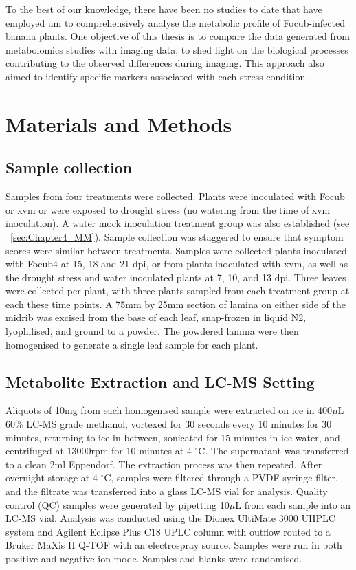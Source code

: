To the best of our knowledge, there have been no studies to date that have employed \ac{um} to comprehensively analyse the metabolic profile of \ac{Focub}-infected banana plants. One objective of this thesis is to compare the data generated from metabolomics studies with imaging data, to shed light on the biological processes contributing to the observed differences during imaging. This approach also aimed to identify specific markers associated with each stress condition. 

\newpage
\section{Materials and Methods}

\subsection{Sample collection}
Samples from four treatments were collected. Plants were inoculated with \ac{Focub} or \ac{xvm} or were exposed to drought stress (no watering from the time of \ac{xvm} inoculation). A water mock inoculation treatment group was also established (see ~\ref{sec:Chapter4_MM}). 
Sample collection was staggered to ensure that symptom scores were similar between treatments. Samples were collected plants inoculated with \ac{Focub4} at 15, 18 and 21 \ac{dpi}, or from plants inoculated with \ac{xvm}, as well as the drought stress and water inoculated plants at 7, 10, and 13 \ac{dpi}. Three leaves were collected per plant, with three plants sampled from each treatment group at each these time points. A 75mm by 25mm section of lamina on either side of the midrib was excised from the base of each leaf, snap-frozen in liquid N2, lyophilised, and ground to a powder. The powdered lamina were then homogenised to generate a single leaf sample for each plant. 

\subsection{Metabolite Extraction and LC-MS Setting}
Aliquots of 10mg from each homogenised sample were extracted on ice in 400\(\mu\)L 60\% LC-MS grade methanol, vortexed for 30 seconds every 10 minutes for 30 minutes, returning to ice in between, sonicated for 15 minutes in ice-water, and centrifuged at 13000rpm for 10 minutes at 4 $^{\circ}$C. The supernatant was transferred to a clean 2ml Eppendorf. The extraction process was then repeated. After overnight storage at 4 $^{\circ}$C, samples were filtered through a PVDF syringe filter, and the filtrate was transferred into a glass LC-MS vial for analysis. Quality control (QC) samples were generated by pipetting 10\(\mu\)L from each sample into an LC-MS vial. Analysis was conducted using the Dionex UltiMate 3000 UHPLC system and Agilent Eclipse Plus C18 UPLC column with outflow routed to a Bruker MaXis II Q-TOF with an electrospray source. Samples were run in both positive and negative ion mode. Samples and blanks were randomised.

